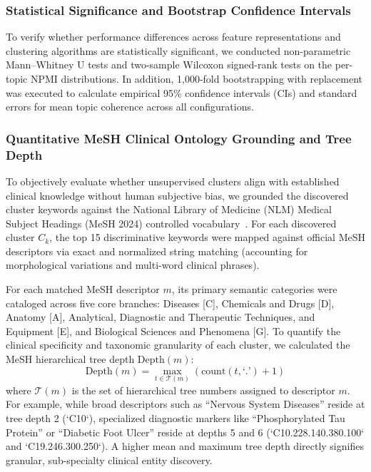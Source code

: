 \documentclass[a4paper,10pt,conference]{IEEEtran}
\begin{document}
\subsubsection{Statistical Significance and Bootstrap Confidence Intervals}

To verify whether performance differences across feature representations and clustering algorithms are statistically significant, we conducted non-parametric Mann--Whitney U tests and two-sample Wilcoxon signed-rank tests on the per-topic NPMI distributions. In addition, 1,000-fold bootstrapping with replacement was executed to calculate empirical 95\% confidence intervals (CIs) and standard errors for mean topic coherence across all configurations.

\subsubsection{Quantitative MeSH Clinical Ontology Grounding and Tree Depth}

To objectively evaluate whether unsupervised clusters align with established clinical knowledge without human subjective bias, we grounded the discovered cluster keywords against the National Library of Medicine (NLM) Medical Subject Headings (MeSH 2024) controlled vocabulary~\cite{ref36}. For each discovered cluster $C_k$, the top 15 discriminative keywords were mapped against official MeSH descriptors via exact and normalized string matching (accounting for morphological variations and multi-word clinical phrases).

For each matched MeSH descriptor $m$, its primary semantic categories were cataloged across five core branches: Diseases [C], Chemicals and Drugs [D], Anatomy [A], Analytical, Diagnostic and Therapeutic Techniques, and Equipment [E], and Biological Sciences and Phenomena [G]. To quantify the clinical specificity and taxonomic granularity of each cluster, we calculated the MeSH hierarchical tree depth $\text{Depth}(m)$:
\begin{equation}
\text{Depth}(m) = \max_{t \in \mathcal{T}(m)} (\text{count}(t, \text{`.{}'}) + 1)
\end{equation}
where $\mathcal{T}(m)$ is the set of hierarchical tree numbers assigned to descriptor $m$. For example, while broad descriptors such as ``Nervous System Diseases'' reside at tree depth 2 (`C10`), specialized diagnostic markers like ``Phosphorylated Tau Protein'' or ``Diabetic Foot Ulcer'' reside at depths 5 and 6 (`C10.228.140.380.100` and `C19.246.300.250`). A higher mean and maximum tree depth directly signifies granular, sub-specialty clinical entity discovery.
\end{document}
